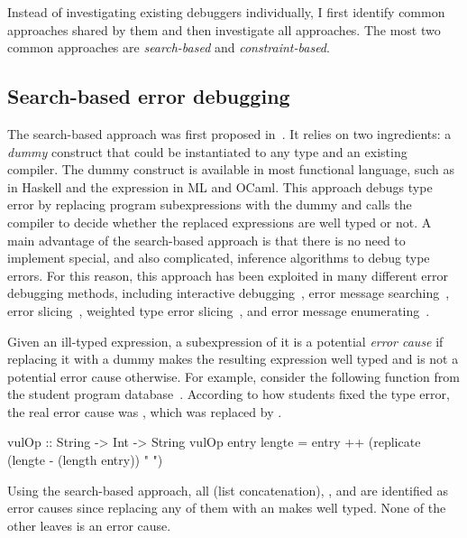 \documentclass[12pt]{report}	%
\begin{document}
Instead of investigating existing debuggers individually,
I first identify common approaches shared by them and then investigate all approaches.
The most two common approaches are
\emph{search-based} and \emph{constraint-based}.

\subsection{Search-based error debugging}
\label{sec:background:leaves:search}

The search-based approach was first proposed in~\cite{Bernstein95:DTE}.
%
It relies on two ingredients: a \emph{dummy}
construct that could be instantiated to any type and
an existing compiler. The dummy construct is
available in most functional language, such as
 in Haskell
and the  expression in ML and OCaml.
%
This approach debugs type error by replacing program subexpressions
with the dummy and calls the compiler to decide whether
the replaced expressions are well typed or not.
%
A main advantage of the search-based approach is that there is no
need to implement special, and also complicated, inference
algorithms to debug type errors.
For this reason, this approach has been
exploited in many different error debugging methods,
including interactive
debugging~\cite{Brassel04:TH,Tsushima13:ETD},
error message
searching~\cite{Lerner06:SSM,Lerner07:STM},
error slicing~\cite{Schilling12:CFT},
weighted type error
slicing~\cite{TSUSHIMA14:WTE}, and error message
enumerating~\cite{Tsushima14:ECF}.

Given an ill-typed expression, a subexpression of
it is a potential \emph{error cause} if
replacing it with a dummy makes the resulting
expression well typed and is not a potential error
cause otherwise.
For example, consider the following function
 from the student program
database~\cite{Heliumbp}. According to how students fixed
the type error, the real error cause was ,
which was replaced by \progsq{ }.
%
\begin{program}
vulOp :: String -> Int -> String
vulOp entry lengte = entry ++ (replicate (lengte - (length entry)) " ")
\end{program}
%
%
%
Using the search-based approach, all \prog{(++)} (list concatenation),
, and  are identified as error causes since
replacing any of them with an  makes 
well typed. None of the other leaves is an error cause.
\end{document}
